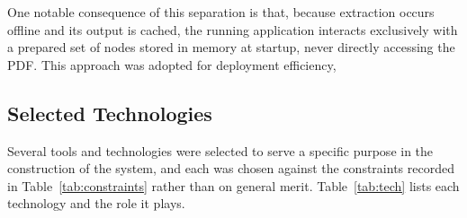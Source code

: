 One notable consequence of this separation is that, because extraction occurs offline and its output is cached, the running application interacts exclusively with a prepared set of nodes stored in memory at startup, never directly accessing the PDF. This approach was adopted for deployment efficiency,

\subsection{Selected Technologies}

Several tools and technologies were selected to serve a specific purpose in the construction of the system, and each was chosen against the constraints recorded in Table~\ref{tab:constraints} rather than on general merit. Table~\ref{tab:tech} lists each technology and the role it plays.

